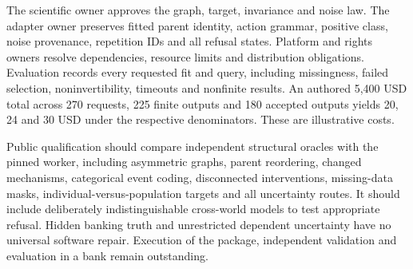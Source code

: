 The scientific owner approves the graph, target, invariance and noise law.
The adapter owner preserves fitted parent identity, action grammar,
positive class, noise provenance, repetition IDs and all refusal states.
Platform and rights owners resolve dependencies, resource limits and
distribution obligations. Evaluation records every requested fit and query,
including missingness, failed selection, noninvertibility, timeouts and
nonfinite results. An authored 5,400 USD total across 270 requests,
225 finite outputs and 180 accepted outputs yields 20, 24 and 30 USD
under the respective denominators. These are illustrative costs.
\citep{exec24_gcm_choice}

Public qualification should compare independent structural oracles with
the pinned worker, including asymmetric graphs, parent reordering,
changed mechanisms, categorical event coding, disconnected interventions,
missing-data masks, individual-versus-population targets and all uncertainty
routes. It should include deliberately indistinguishable cross-world models
to test appropriate refusal. Hidden banking truth and unrestricted dependent
uncertainty have no universal software repair. Execution of the package, independent validation and evaluation in a bank remain outstanding.~\citep{exec24_gcm_choice}
